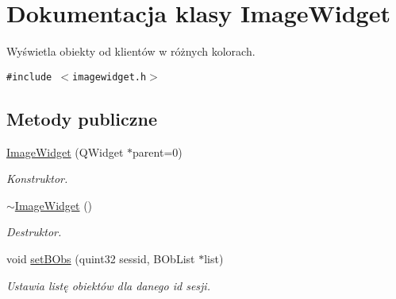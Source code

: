 \hypertarget{class_image_widget}{
\section{Dokumentacja klasy ImageWidget}
\label{class_image_widget}
}
Wyświetla obiekty od klientów w różnych kolorach.  


{\tt \#include $<$imagewidget.h$>$}

\subsection*{Metody publiczne}
\begin{CompactItemize}
\item 
\hypertarget{class_image_widget_29f5483569b0ac4abd6b25bb640f9250}{
\hyperlink{class_image_widget_29f5483569b0ac4abd6b25bb640f9250}{ImageWidget} (QWidget $\ast$parent=0)}
\label{class_image_widget_29f5483569b0ac4abd6b25bb640f9250}

\begin{CompactList}\small\item\em Konstruktor. \item\end{CompactList}\item 
\hypertarget{class_image_widget_d7ce3e83b4756c1cadb25d27439eea9b}{
\hyperlink{class_image_widget_d7ce3e83b4756c1cadb25d27439eea9b}{$\sim$ImageWidget} ()}
\label{class_image_widget_d7ce3e83b4756c1cadb25d27439eea9b}

\begin{CompactList}\small\item\em Destruktor. \item\end{CompactList}\item 
void \hyperlink{class_image_widget_a86269777fd7075bc223a5c8e011252b}{setBObs} (quint32 sessid, BObList $\ast$list)
\begin{CompactList}\small\item\em Ustawia listę obiektów dla danego id sesji. \item\end{CompactList}\end{CompactItemize}
